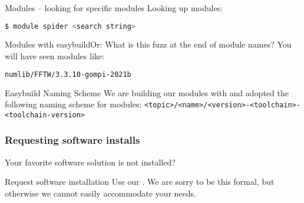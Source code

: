\begin{frame}[fragile]
  {Modules -- looking for specific modules}
  Looking up modules:
  \begin{lstlisting}[language=Bash, style=Shell]
$ module spider <search string>
  \end{lstlisting}
  \pause
\end{frame}

\begin{frame}[fragile]
   {Modules with easybuild\newline Or: What is this fuzz at the end of module names?}
   You will have seen modules like:
   \begin{lstlisting}[language=Bash, style=Shell]
numlib/FFTW/3.3.10-gompi-2021b   
   \end{lstlisting}
   \pause
   \begin{block}{Easybuild Naming Scheme}
    We are building our modules with  and adopted the following naming scheme for modules:\newline
    \footnotesize \verb+<topic>/<name>/<version>-<toolchain>-<toolchain-version>+
   \end{block}
   \pause
\end{frame}

\begin{frame}
  \frametitle{Requesting software installs}
  Your favorite software solution is not installed?
  \begin{exampleblock}{Request software installation}
    Use our .\newline
    We are sorry to be this formal, but otherwise we cannot easily accommodate your needs.
  \end{exampleblock}
  \pause
  \vfill
\end{frame}


